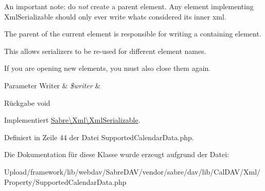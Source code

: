 An important note\+: do {\itshape not} create a parent element. Any element implementing Xml\+Serializable should only ever write what\textquotesingle{}s considered its \textquotesingle{}inner xml\textquotesingle{}.

The parent of the current element is responsible for writing a containing element.

This allows serializers to be re-\/used for different element names.

If you are opening new elements, you must also close them again.


\begin{DoxyParams}[1]{Parameter}
Writer & {\em \$writer} & \\
\hline
\end{DoxyParams}
\begin{DoxyReturn}{Rückgabe}
void 
\end{DoxyReturn}


Implementiert \mbox{\hyperlink{interface_sabre_1_1_xml_1_1_xml_serializable_aa78f3ee43aa699be8347181653a53d8c}{Sabre\textbackslash{}\+Xml\textbackslash{}\+Xml\+Serializable}}.



Definiert in Zeile 44 der Datei Supported\+Calendar\+Data.\+php.



Die Dokumentation für diese Klasse wurde erzeugt aufgrund der Datei\+:\begin{DoxyCompactItemize}
\item 
Upload/framework/lib/webdav/\+Sabre\+D\+A\+V/vendor/sabre/dav/lib/\+Cal\+D\+A\+V/\+Xml/\+Property/Supported\+Calendar\+Data.\+php\end{DoxyCompactItemize}

